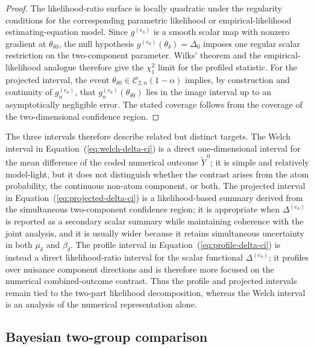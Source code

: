 \documentclass[11pt]{article}
\begin{document}
\begin{proof}
The likelihood-ratio surface is locally quadratic under the regularity conditions for the corresponding parametric likelihood or empirical-likelihood estimating-equation model. Since $g^{(e_0)}$ is a smooth scalar map with nonzero gradient at $\theta_{\delta0}$, the null hypothesis $g^{(e_0)}(\theta_\delta)=\Delta_0$ imposes one regular scalar restriction on the two-component parameter. Wilks' theorem and the empirical-likelihood analogue therefore give the $\chi^2_1$ limit for the profiled statistic. For the projected interval, the event $\theta_{\delta0}\in\mathcal{C}_{2,n}(1-\alpha)$ implies, by construction and continuity of $g_n^{(e_0)}$, that $g_n^{(e_0)}(\theta_{\delta0})$ lies in the image interval up to an asymptotically negligible error. The stated coverage follows from the coverage of the two-dimensional confidence region.
\end{proof}

The three intervals therefore describe related but distinct targets. The Welch interval in Equation~(\ref{eq:welch-delta-ci}) is a direct one-dimensional interval for the mean difference of the coded numerical outcome $\widetilde{Y}^{\,0}$; it is simple and relatively model-light, but it does not distinguish whether the contrast arises from the atom probability, the continuous non-atom component, or both. The projected interval in Equation~(\ref{eq:projected-delta-ci}) is a likelihood-based summary derived from the simultaneous two-component confidence region; it is appropriate when $\Delta^{(e_0)}$ is reported as a secondary scalar summary while maintaining coherence with the joint analysis, and it is usually wider because it retains simultaneous uncertainty in both $\mu_\delta$ and $\beta_\delta$. The profile interval in Equation~(\ref{eq:profile-delta-ci}) is instead a direct likelihood-ratio interval for the scalar functional $\Delta^{(e_0)}$; it profiles over nuisance component directions and is therefore more focused on the numerical combined-outcome contrast. Thus the profile and projected intervals remain tied to the two-part likelihood decomposition, whereas the Welch interval is an analysis of the numerical representation alone.





\subsection{Bayesian two-group comparison}\label{sec:bayesian-two-group}
\end{document}

